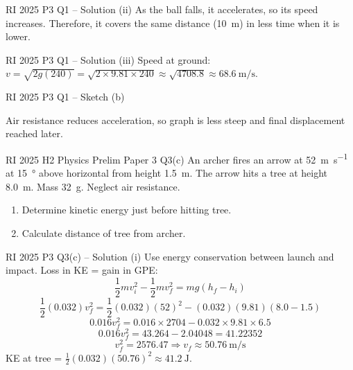 \documentclass{beamer}
\begin{document}
\begin{frame}[shrink=15]{RI 2025 P3 Q1 – Solution (ii)}
As the ball falls, it accelerates, so its speed increases. Therefore, it covers the same distance (\SI{10}{\m}) in less time when it is lower.
\end{frame}

\begin{frame}[shrink=15]{RI 2025 P3 Q1 – Solution (iii)}
Speed at ground: $v = \sqrt{2g(240)} = \sqrt{2\times9.81\times240} \approx \sqrt{4708.8} \approx \SI{68.6}{\meter\per\second}$.
\end{frame}

\begin{frame}[shrink=15]{RI 2025 P3 Q1 – Sketch (b)}
\begin{center}
\end{center}
Air resistance reduces acceleration, so graph is less steep and final displacement reached later.
\end{frame}

\begin{frame}[t,shrink=15]{RI 2025 H2 Physics Prelim Paper 3 Q3(c)}
An archer fires an arrow at \SI{52}{\meter\per\second} at \SI{15}{\degree} above horizontal from height \SI{1.5}{\m}. The arrow hits a tree at height \SI{8.0}{\m}. Mass \SI{32}{\g}. Neglect air resistance.
\begin{enumerate}
    \item[(i)] Determine kinetic energy just before hitting tree.
    \item[(ii)] Calculate distance of tree from archer.
\end{enumerate}
\end{frame}

\begin{frame}[shrink=15]{RI 2025 P3 Q3(c) – Solution (i)}
Use energy conservation between launch and impact. Loss in KE = gain in GPE:
\[ \frac12 m v_i^2 - \frac12 m v_f^2 = mg(h_f - h_i) \]
\[ \frac12 (0.032) v_f^2 = \frac12 (0.032)(52)^2 - (0.032)(9.81)(8.0-1.5) \]
\[ 0.016 v_f^2 = 0.016\times2704 - 0.032\times9.81\times6.5 \]
\[ 0.016 v_f^2 = 43.264 - 2.04048 = 41.22352 \]
\[ v_f^2 = 2576.47 \Rightarrow v_f \approx 50.76 \ \text{m/s} \]
KE at tree = $\frac12 (0.032)(50.76)^2 \approx \SI{41.2}{\joule}$.
\end{frame}
\end{document}
